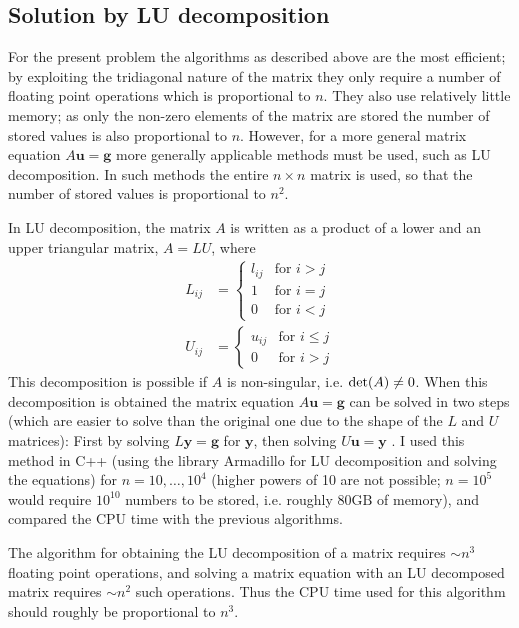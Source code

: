 \documentclass[a4paper,english]{article}
\renewcommand\vec{\mathbf}
\let\originalleft\left
\let\originalright\right
\renewcommand{\left}{\mathopen{}\mathclose\bgroup\originalleft}
\renewcommand{\right}{\aftergroup\egroup\originalright}
\begin{document}
\subsection{Solution by LU decomposition}
For the present problem the algorithms as described above are the most efficient; by exploiting the tridiagonal nature of the matrix they only require a number of floating point operations which is proportional to $n$. They also use relatively little memory; as only the non-zero elements of the matrix are stored the number of stored values is also proportional to $n$. However, for a more general matrix equation $A\vec{u} = \vec{g}$ more generally applicable methods must be used, such as LU decomposition. In such methods the entire $n\times n$ matrix is used, so that the number of stored values is proportional to $n^2$. \par
In LU decomposition, the matrix $A$ is written as a product of a lower and an upper triangular matrix, $A=LU$, where \cite{lecturenotes}
\begin{align}
  L_{ij} &=
  \begin{cases}
    l_{ij} & \text{for }i>j \\
    1 & \text{for } i = j \\
    0 & \text{for } i < j
  \end{cases} \\
  U_{ij} &=
  \begin{cases}
    u_{ij} & \text{for } i \leq j \\
    0 & \text{for } i > j
  \end{cases}
\end{align}
This decomposition is possible if $A$ is non-singular, i.e. $\text{det}\left(A\right) \neq 0$. When this decomposition is obtained the matrix equation $A\vec{u} = \vec{g}$ can be solved in two steps (which are easier to solve than the original one due to the shape of the $L$ and $U$ matrices): First by solving $L\vec{y} = \vec{g}$ for $\vec{y}$, then solving $U\vec{u} = \vec{y}$ \cite{lecturenotes}. I used this method in C++ (using the library Armadillo\cite{armadillo1}\cite{armadillo2} for LU decomposition and solving the equations) for $n=10, \dots, 10^4$ (higher powers of 10 are not possible; $n=10^5$ would require $10^{10}$ numbers to be stored, i.e. roughly $80\text{GB}$ of memory), and compared the CPU time with the previous algorithms.\par
The algorithm for obtaining the LU decomposition of a matrix requires $\sim n^3$ floating point operations, and solving a matrix equation with an LU decomposed matrix requires $\sim n^2$ such operations\cite{lecturenotes}. Thus the CPU time used for this algorithm should roughly be proportional to $n^3$.
\end{document}
